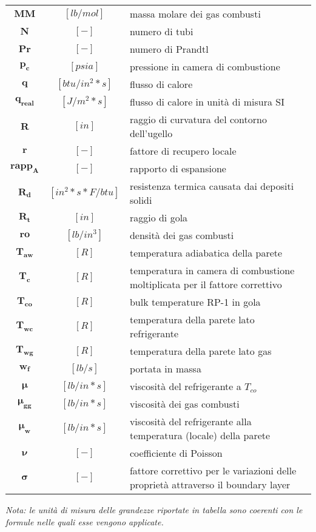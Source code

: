 \begin{multicols}{2}
{\begin{xltabular}{\linewidth}{cc>{\raggedright\arraybackslash}X}
		$\bm{MM}$ & $[lb/mol]$ & massa molare dei gas combusti \\
		$\bm{N}$ & $[-]$ & numero di tubi \\
		$\bm{Pr}$ & $[-]$ & numero di Prandtl \\
		$\bm{p_c}$ & $[psia]$ & pressione in camera di combustione \\
		$\bm{q}$ & $[btu/in^2*s]$ & flusso di calore \\
		$\bm{q_{real}}$ & $[J/m^2*s]$ & flusso di calore in unità di misura SI \\
		$\bm{R}$ & $[in]$ & raggio di curvatura del contorno dell'ugello \\
		$\bm{r}$ & $[-]$ & fattore di recupero locale \\
		$\bm{rapp_A}$ & $[-]$ & rapporto di espansione \\
		$\bm{R_d}$ & $[in^2*s*F/btu]$ & resistenza termica causata dai depositi solidi \\
		$\bm{R_t}$ & $[in]$ & raggio di gola \\
		$\bm{ro}$ & $[lb/in^3]$ & densità dei gas combusti \\
		$\bm{T_{aw}}$ & $[R]$ & temperatura adiabatica della parete \\
		$\bm{T_c}$ & $[R]$ & temperatura in camera di combustione moltiplicata per il fattore correttivo \\
		$\bm{T_{co}}$ & $[R]$ & bulk temperature RP-1 in gola \\
		$\bm{T_{wc}}$ & $[R]$ & temperatura della parete lato refrigerante\\
		$\bm{T_{wg}}$ & $[R]$ & temperatura della parete lato gas \\
		$\bm{w_f}$ & $[lb/s]$ & portata in massa\\
		$\bm{\mu}$ & $[lb/in*s]$ & viscosità del refrigerante a $T_{co}$\\
		$\bm{\mu_{gg}}$ & $[lb/in*s]$ & viscosità dei gas combusti\\
		$\bm{\mu_w}$ & $[lb/in*s]$ & viscosità del refrigerante alla temperatura (locale) della parete \\
		$\bm{\nu}$ & $[-]$ & coefficiente di Poisson \\
		$\bm{\sigma}$ & $[-]$ & fattore correttivo per le variazioni delle proprietà attraverso  il boundary layer 
	\end{xltabular}
	\unskip
	\unpenalty
	\unpenalty}
	\unvbox\ltmcbox

\end{multicols}

\textit{Nota: le unità di misura delle grandezze riportate in tabella sono coerenti con le formule nelle quali esse vengono applicate.}